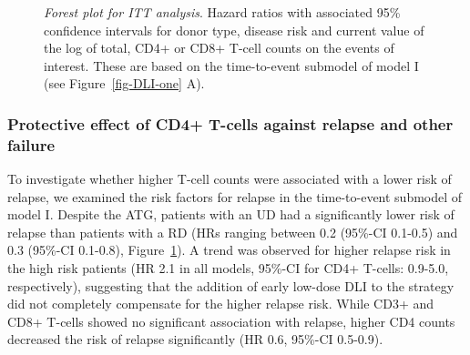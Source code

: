\documentclass[
  letterpaper,
  paper=240mm:170mm,
  twoside=true,
  open=right,
  fontsize=10pt,
  pagesize=false,
  BCOR=15mm,
  DIV=14,
  headinclude=true,
  footinclude=false,
  headsepline=on]{scrbook}
\begin{document}
\begin{figure}


\caption{\label{fig-DLI-five}\emph{Forest plot for ITT analysis}. Hazard
ratios with associated 95\% confidence intervals for donor type, disease
risk and current value of the log of total, CD4+ or CD8+ T-cell counts
on the events of interest. These are based on the time-to-event submodel
of model I (see Figure~\ref{fig-DLI-one} A).}

\end{figure}%

\subsubsection{Protective effect of CD4+ T-cells against relapse and
other
failure}\label{protective-effect-of-cd4-t-cells-against-relapse-and-other-failure}

To investigate whether higher T-cell counts were associated with a lower
risk of relapse, we examined the risk factors for relapse in the
time-to-event submodel of model I. Despite the ATG, patients with an UD
had a significantly lower risk of relapse than patients with a RD (HRs
ranging between 0.2 (95\%-CI 0.1-0.5) and 0.3 (95\%-CI 0.1-0.8),
Figure~\ref{fig-DLI-five}). A trend was observed for higher relapse risk
in the high risk patients (HR 2.1 in all models, 95\%-CI for CD4+
T-cells: 0.9-5.0, respectively), suggesting that the addition of early
low-dose DLI to the strategy did not completely compensate for the
higher relapse risk. While CD3+ and CD8+ T-cells showed no significant
association with relapse, higher CD4 counts decreased the risk of
relapse significantly (HR 0.6, 95\%-CI 0.5-0.9).
\end{document}
